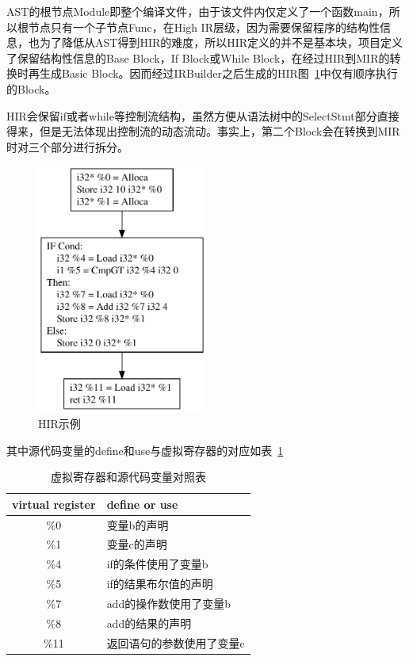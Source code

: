 AST的根节点Module即整个编译文件，由于该文件内仅定义了一个函数main，所以根节点只有一个子节点Func，在High IR层级，因为需要保留程序的结构性信息，也为了降低从AST得到HIR的难度，所以HIR定义的并不是基本块，项目定义了保留结构性信息的Base Block，If Block或While Block，在经过HIR到MIR的转换时再生成Basic Block。因而经过IRBuilder之后生成的HIR图~\ref{fig:HIR}中仅有顺序执行的Block。

HIR会保留if或者while等控制流结构，虽然方便从语法树中的SelectStmt部分直接得来，但是无法体现出控制流的动态流动。事实上，第二个Block会在转换到MIR时对三个部分进行拆分。

\begin{figure}[htb]
  \centering
  \includegraphics[width=0.5\textwidth]{figures/HIR.pdf}
  \caption{HIR示例}
\label{fig:HIR}
\end{figure}

其中源代码变量的define和use与虚拟寄存器的对应如表~\ref{tab:compare}

\begin{table}[htb]
  \centering\small
  \caption{虚拟寄存器和源代码变量对照表}
  \label{tab:compare}
  \begin{tabular}{cl}
    \toprule
    virtual register  & define or use   \\
    \midrule
    \%0 & 变量b的声明 \\
    \%1 & 变量c的声明 \\
    \%4 & if的条件使用了变量b \\
    \%5 & if的结果布尔值的声明 \\
    \%7 & add的操作数使用了变量b \\
    \%8 & add的结果的声明 \\
    \%11 & 返回语句的参数使用了变量c \\
\bottomrule
  \end{tabular}
\end{table}


